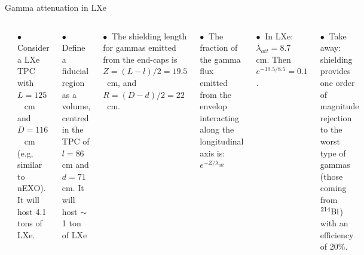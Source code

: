 \documentclass [aspectratio=169]{beamer}
\newcommand{\BI}{\ensuremath{{}^{214}{\rm Bi}}}
\begin{document}
\begin{frame}{Gamma attenuation in LXe}
\begin{columns}
\includegraphics[scale=0.2]{attLxe.png}

$\bullet~$ Consider a LXe TPC with $L = 125$~ cm and $D = 116$~ cm (e.g, similar to nEXO). It will host 4.1 tons of LXe.

$\bullet~$ Define a fiducial region as a volume, centred in the TPC of 
$l = 86$~ cm and $d = 71$~ cm. It will host $\sim$1 ton of LXe

$\bullet~$ The shielding length for gammas emitted from the end-caps is 
$Z = (L - l)/2 = 19.5$~cm, and $R = (D-d)/2 = 22$~cm.  

$\bullet~$ The fraction of the gamma flux emitted from the envelop interacting along the longitudinal axis is:  $ e^{-Z/\lambda_{att}}$

$\bullet~$  In LXe: $\lambda_{att} = 8.7~$ cm. Then $e^{-19.5/8.5} = 0.1$.
 
 $\bullet~$ Take away: shielding provides one order of magnitude rejection to the worst type of gammas (those coming from \BI) with an efficiency of 20\%. 
\end{columns}
\end{frame}
\end{document}
